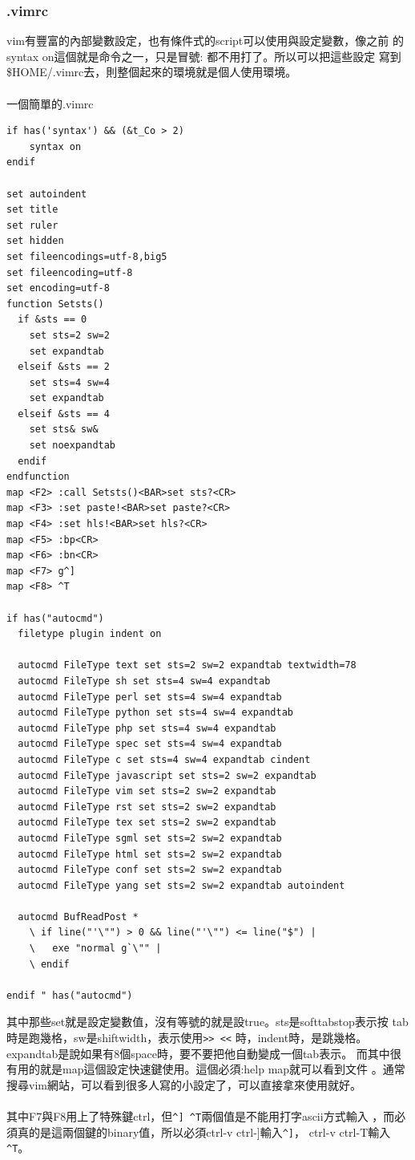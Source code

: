       \subsubsection{.vimrc}
      vim有豐富的內部變數設定，也有條件式的script可以使用與設定變數，像之前
      的syntax on這個就是命令之一，只是冒號: 都不用打了。所以可以把這些設定
      寫到\$HOME/.vimrc去，則整個起來的環境就是個人使用環境。
      \\\\
      一個簡單的.vimrc
      \begin{verbatim}
if has('syntax') && (&t_Co > 2)
	syntax on
endif

set autoindent
set title
set ruler
set hidden
set fileencodings=utf-8,big5
set fileencoding=utf-8
set encoding=utf-8
function Setsts()
  if &sts == 0
    set sts=2 sw=2
    set expandtab
  elseif &sts == 2
    set sts=4 sw=4
    set expandtab
  elseif &sts == 4
    set sts& sw&
    set noexpandtab
  endif
endfunction
map <F2> :call Setsts()<BAR>set sts?<CR>
map <F3> :set paste!<BAR>set paste?<CR>
map <F4> :set hls!<BAR>set hls?<CR>
map <F5> :bp<CR>
map <F6> :bn<CR>
map <F7> g^]
map <F8> ^T

if has("autocmd")
  filetype plugin indent on

  autocmd FileType text set sts=2 sw=2 expandtab textwidth=78
  autocmd FileType sh set sts=4 sw=4 expandtab
  autocmd FileType perl set sts=4 sw=4 expandtab
  autocmd FileType python set sts=4 sw=4 expandtab
  autocmd FileType php set sts=4 sw=4 expandtab
  autocmd FileType spec set sts=4 sw=4 expandtab
  autocmd FileType c set sts=4 sw=4 expandtab cindent
  autocmd FileType javascript set sts=2 sw=2 expandtab
  autocmd FileType vim set sts=2 sw=2 expandtab
  autocmd FileType rst set sts=2 sw=2 expandtab
  autocmd FileType tex set sts=2 sw=2 expandtab
  autocmd FileType sgml set sts=2 sw=2 expandtab
  autocmd FileType html set sts=2 sw=2 expandtab
  autocmd FileType conf set sts=2 sw=2 expandtab
  autocmd FileType yang set sts=2 sw=2 expandtab autoindent

  autocmd BufReadPost *
    \ if line("'\"") > 0 && line("'\"") <= line("$") |
    \   exe "normal g`\"" |
    \ endif

endif " has("autocmd")
      \end{verbatim}
      其中那些set就是設定變數值，沒有等號的就是設true。sts是softtabstop表示按
      tab時是跑幾格，sw是shiftwidth，表示使用\verb=>> <<= 時，indent時，是跳幾格。
      expandtab是說如果有8個space時，要不要把他自動變成一個tab表示。
      而其中很有用的就是map這個設定快速鍵使用。這個必須:help map就可以看到文件
      。通常搜尋vim網站，可以看到很多人寫的小設定了，可以直接拿來使用就好。
      \\\\
      其中F7與F8用上了特殊鍵ctrl，但\verb=^] ^T=兩個值是不能用打字ascii方式輸入
      ，而必須真的是這兩個鍵的binary值，所以必須ctrl-v ctrl-]輸入\verb=^]=，
      ctrl-v ctrl-T輸入\verb=^T=。

